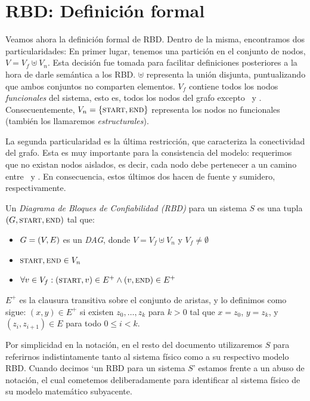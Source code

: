 \section{RBD: Definición formal}
\label{sec:rbd_definicion}
Veamos ahora la definición formal de RBD. Dentro de la misma, encontramos dos particularidades: 
En primer lugar, tenemos una partición en el conjunto de nodos, $V = V_f \uplus V_n$. Esta decisión fue tomada para facilitar definiciones posteriores a la hora de darle semántica a los RBD. $\uplus$ representa la unión disjunta, puntualizando que ambos conjuntos no comparten elementos. $V_f$ contiene todos los nodos \textit{funcionales} del sistema, esto es, todos los nodos del grafo excepto \start\ y \nd. Consecuentemente, $V_n = \{\textsc{start}, \textsc{end}\}$ representa los nodos no funcionales (también los llamaremos \textit{estructurales}).

La segunda particularidad es la última restricción, que caracteriza la conectividad del grafo. Esta es muy importante para la consistencia del modelo: requerimos que no existan nodos aislados, es decir, cada nodo debe pertenecer a un camino entre \start\ y \nd. En consecuencia, estos últimos dos hacen de fuente y sumidero, respectivamente.

\begin{definition}[RBD]
Un \textit{Diagrama de Bloques de Confiabilidad (RBD)} para un sistema $S$ es una tupla $(G, \textsc{start}, \textsc{end})$ tal que:
\begin{itemize}
    \item $G=(V,E)$ es un \textit{DAG}, donde $V = V_f \uplus V_n$ y $V_f \neq \emptyset$
    \item $\textsc{start}, \textsc{end} \in V_n$
    \item $\forall v \in V_f : (\textsc{start}, v) \in E^+ \land (v, \textsc{end}) \in E^+$
\end{itemize}
\end{definition}

$E^+$ es la clausura transitiva sobre el conjunto de aristas, y lo definimos como sigue: $(x,y) \in E^+$ si existen $ z_0, \ldots, z_k$ para $k>0$ tal que $x=z_0$, $y=z_k$, y $(z_i,z_{i+1}) \in E$ para todo $0\leq i<k$. 

Por simplicidad en la notación, en el resto del documento utilizaremos $S$ para referirnos indistintamente tanto al sistema físico como a su respectivo modelo RBD. Cuando decimos `un RBD para un sistema $S$' estamos frente a un abuso de notación, el cual cometemos deliberadamente para identificar al sistema físico de su modelo matemático subyacente.


